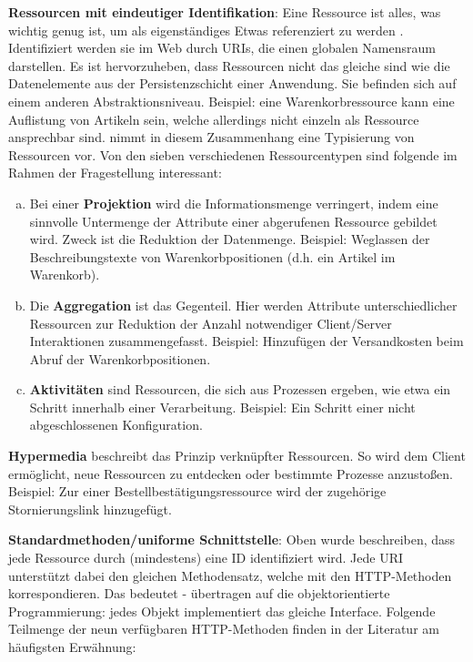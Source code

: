 \documentclass[12pt,a4paper,bibliography=totocnumbered,listof=totoc]{scrartcl}
\begin{document}
\begin{compactitem}
\item \textbf{Ressourcen mit eindeutiger Identifikation}: \glqq Eine Ressource ist alles, was wichtig genug ist, um als eigenständiges Etwas referenziert zu werden\grqq{} \citep{richardson07}. Identifiziert werden sie im Web durch URIs, die einen globalen Namensraum darstellen.  Es ist hervorzuheben, dass Ressourcen nicht das gleiche sind wie die Datenelemente aus der Persistenzschicht einer Anwendung. Sie befinden sich auf einem anderen Abstraktionsniveau. Beispiel: eine Warenkorbressource kann eine Auflistung von Artikeln sein, welche allerdings nicht einzeln als Ressource ansprechbar sind. \citeauthor{tilkov11} nimmt in diesem Zusammenhang eine Typisierung von Ressourcen vor. Von den sieben verschiedenen Ressourcentypen sind folgende im Rahmen der Fragestellung interessant:
\begin{enumerate}[a.]
\item Bei einer \textbf{Projektion} wird die Informationsmenge verringert, indem eine sinnvolle Untermenge der Attribute einer abgerufenen Ressource gebildet wird. Zweck ist die Reduktion der Datenmenge. Beispiel: Weglassen der Beschreibungstexte von Warenkorbpositionen (d.h. ein Artikel im Warenkorb).
\item Die \textbf{Aggregation} ist das Gegenteil. Hier werden Attribute unterschiedlicher Ressourcen zur Reduktion der Anzahl notwendiger Client/Server Interaktionen zusammengefasst. Beispiel: Hinzufügen der Versandkosten beim Abruf der Warenkorbpositionen.
\item \textbf{Aktivitäten} sind Ressourcen, die sich aus Prozessen ergeben, wie etwa ein Schritt innerhalb einer Verarbeitung. Beispiel: Ein Schritt einer nicht abgeschlossenen Konfiguration.
\end{enumerate}
\item \textbf{Hypermedia} beschreibt das Prinzip verknüpfter Ressourcen. So wird dem Client ermöglicht, neue Ressourcen zu entdecken oder bestimmte Prozesse anzustoßen. Beispiel: Zur einer Bestellbestätigungsressource wird der zugehörige Stornierungslink hinzugefügt.
\item \textbf{Standardmethoden/uniforme Schnittstelle}: Oben wurde beschreiben, dass jede Ressource durch (mindestens) eine ID identifiziert wird. Jede URI unterstützt dabei den gleichen Methodensatz, welche mit den HTTP-Methoden korrespondieren. Das bedeutet - übertragen auf die objektorientierte Programmierung: jedes Objekt implementiert das gleiche Interface. Folgende Teilmenge der neun verfügbaren HTTP-Methoden finden in der Literatur am häufigsten Erwähnung:

\end{compactitem}
\end{document}

